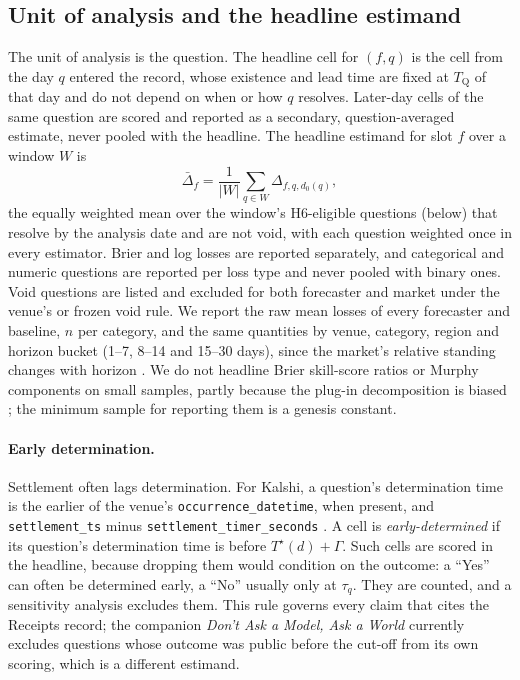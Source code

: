 \documentclass[11pt]{article}
\newcommand{\Ts}{T^{\star}}
\newcommand{\tQ}{T_{\mathrm{Q}}}
\begin{document}
\subsection{Unit of analysis and the headline estimand}

The unit of analysis is the question. The headline cell for $(f,q)$ is the cell from the day $q$ entered the record, whose existence and lead time are fixed at $\tQ$ of that day and do not depend on when or how $q$ resolves. Later-day cells of the same question are scored and reported as a secondary, question-averaged estimate, never pooled with the headline. The headline estimand for slot $f$ over a window $W$ is
\begin{equation}
  \bar\Delta_f = \frac{1}{|W|} \sum_{q \in W} \Delta_{f,q,d_0(q)},
\end{equation}
the equally weighted mean over the window's H6-eligible questions (below) that resolve by the analysis date and are not void, with each question weighted once in every estimator. Brier and log losses are reported separately, and categorical and numeric questions are reported per loss type and never pooled with binary ones. Void questions are listed and excluded for both forecaster and market under the venue's or frozen void rule. We report the raw mean losses of every forecaster and baseline, $n$ per category, and the same quantities by venue, category, region and horizon bucket (1--7, 8--14 and 15--30 days), since the market's relative standing changes with horizon \citep{yang2025prophet}. We do not headline Brier skill-score ratios or Murphy components on small samples, partly because the plug-in decomposition is biased \citep{ferro2012bias}; the minimum sample for reporting them is a genesis constant.

\paragraph{Early determination.} Settlement often lags determination. For Kalshi, a question's determination time is the earlier of the venue's \texttt{occurrence\_datetime}, when present, and \texttt{settlement\_ts} minus \texttt{settlement\_timer\_seconds} \citep{kalshi_market}. A cell is \emph{early-determined} if its question's determination time is before $\Ts(d) + \Gamma$. Such cells are scored in the headline, because dropping them would condition on the outcome: a ``Yes'' can often be determined early, a ``No'' usually only at $\tau_q$. They are counted, and a sensitivity analysis excludes them. This rule governs every claim that cites the Receipts record; the companion \emph{Don't Ask a Model, Ask a World} currently excludes questions whose outcome was public before the cut-off from its own scoring, which is a different estimand.
\end{document}
